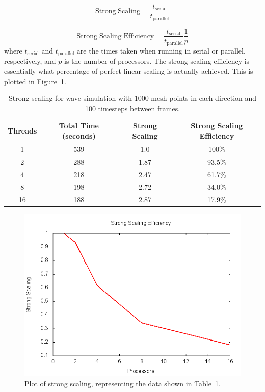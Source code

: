 \documentclass[12pt]{article}
\begin{document}
\begin{equation}
\mathrm{Strong \; Scaling} = \frac{t_{\mathrm{serial}}}{t_{\mathrm{parallel}}}
\label{strongscale}
\end{equation}

\begin{equation}
\mathrm{Strong \; Scaling \; Efficiency} = \frac{t_{\mathrm{serial}}}{t_{\mathrm{parallel}}} \frac{1}{p}
\label{normss}
\end{equation}
where $t_{\mathrm{serial}}$ and $t_{\mathrm{parallel}}$ are the times taken when running in serial or parallel, respectively, and $p$ is the number of processors. The strong scaling efficiency is essentially what percentage of perfect linear scaling is actually achieved. This is plotted in Figure~\ref{ssplot}.

\begin{table}[h]
	\begin{center}
		\begin{tabular}{|c c c c|}
			\hline
			Threads & Total Time (seconds) & Strong Scaling & Strong Scaling Efficiency \\ \hline
			1 & 539 & 1.0  & 100\% \\ \hline
			2 & 288 & 1.87 &  93.5\% \\ \hline
			4 & 218 &  2.47&  61.7\%  \\ \hline
			8 & 198 &  2.72&  34.0\%  \\ \hline
			16 & 188 &  2.87& 17.9\%   \\ \hline
		\end{tabular}
		\caption{Strong scaling for wave simulation with 1000 mesh points in each direction and 100 timesteps between frames.}
		\label{sstable}
	\end{center}
\end{table}

		\begin{figure}[h]
			\begin{center}
				\includegraphics[width=0.5\columnwidth]{ssplot}
				\caption{Plot of strong scaling, representing the data shown in Table~\ref{sstable}.}
				\label{ssplot}
			\end{center}
		\end{figure}
\end{document}
